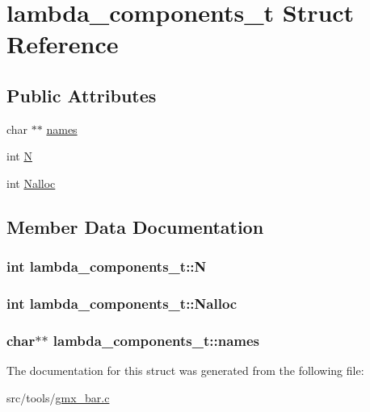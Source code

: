 \hypertarget{structlambda__components__t}{\section{lambda\-\_\-components\-\_\-t \-Struct \-Reference}
\label{structlambda__components__t}
}
\subsection*{\-Public \-Attributes}
\begin{DoxyCompactItemize}
\item 
char $\ast$$\ast$ \hyperlink{structlambda__components__t_adbb27dbe0f163d202b4553be88e9b57e}{names}
\item 
int \hyperlink{structlambda__components__t_a962264fe8cc5da877e37049047417ca7}{\-N}
\item 
int \hyperlink{structlambda__components__t_a907eb90e2ae78bad226f53167765c2fe}{\-Nalloc}
\end{DoxyCompactItemize}


\subsection{\-Member \-Data \-Documentation}
\hypertarget{structlambda__components__t_a962264fe8cc5da877e37049047417ca7}{
\subsubsection[{\-N}]{\setlength{\rightskip}{0pt plus 5cm}int {\bf lambda\-\_\-components\-\_\-t\-::\-N}}}\label{structlambda__components__t_a962264fe8cc5da877e37049047417ca7}
\hypertarget{structlambda__components__t_a907eb90e2ae78bad226f53167765c2fe}{
\subsubsection[{\-Nalloc}]{\setlength{\rightskip}{0pt plus 5cm}int {\bf lambda\-\_\-components\-\_\-t\-::\-Nalloc}}}\label{structlambda__components__t_a907eb90e2ae78bad226f53167765c2fe}
\hypertarget{structlambda__components__t_adbb27dbe0f163d202b4553be88e9b57e}{
\subsubsection[{names}]{\setlength{\rightskip}{0pt plus 5cm}char$\ast$$\ast$ {\bf lambda\-\_\-components\-\_\-t\-::names}}}\label{structlambda__components__t_adbb27dbe0f163d202b4553be88e9b57e}


\-The documentation for this struct was generated from the following file\-:\begin{DoxyCompactItemize}
\item 
src/tools/\hyperlink{gmx__bar_8c}{gmx\-\_\-bar.\-c}\end{DoxyCompactItemize}
